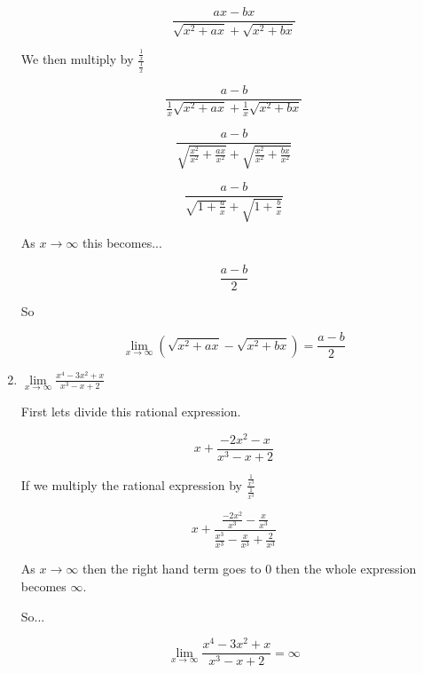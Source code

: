 \documentclass{article}
\begin{document}
\begin{enumerate}
			$$\frac{ax - bx}{ \sqrt{x^2 + ax} + \sqrt{x^2 + bx}}$$

			We then multiply by $\frac{ \frac{1}{x} }{\frac{1}{x}}$

			$$\frac{a - b}{\frac{1}{x}\sqrt{x^2 + ax} + \frac{1}{x}\sqrt{x^2 + bx}}$$

			$$\frac{a - b}{\sqrt{ \frac{x^2}{x^2} + \frac{ax}{x^2}} + \sqrt{\frac{x^2}{x^2} + \frac{bx}{x^2}}}$$

			$$\frac{a-b}{\sqrt{1 + \frac{a}{x}} + \sqrt{1 + \frac{b}{x}}}$$

			As $x \to \infty$ this becomes...

			$$\frac{a-b}{2}$$

			So

			$$\lim \limits _{x \to \infty} (\sqrt{x^2 + ax} - \sqrt{x^2 + bx}) = \frac{a-b}{2}$$

		\item $\lim \limits _{x \to \infty} \frac{x^4 - 3x^2 + x}{x^3 - x + 2}$

			First lets divide this rational expression.

			$$x + \frac{-2x^2-x}{x^3-x+2}$$

			If we multiply the rational expression by $\frac{ \frac{1}{x^3} }{ \frac{1}{x^3} }$

			$$x + \frac{ \frac{-2x^2}{x^3} - \frac{x}{x^3}}{\frac{x^3}{x^3} - \frac{x}{x^3} + \frac{2}{x^3}}$$

			As $x \to \infty$ then the right hand term goes to $0$ then the whole expression becomes $\infty$.

			So...

			$$\lim \limits _{x \to \infty} \frac{x^4 - 3x^2 + x}{x^3 - x + 2} = \infty$$

		
	\end{enumerate}
\end{document}
